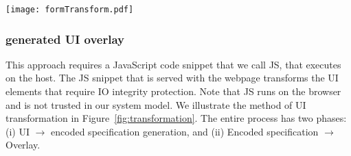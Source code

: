\begin{figure*}[t]
\centering
\texttt{[image: formTransform.pdf]}
\caption{\textbf{Transformation of UI elements: UI $\rightarrow$ encoded specification $\rightarrow$ \device generated UI overlay.} \one The actual webpage and the corresponding \html source shows the UI elements that requires integrity protection. \two These UI elements are transformed into an encoded UI specification (our \name prototype uses QR code that encodes a UI specification, e.g., Specification~\ref{snippet:UISpecification}) by the \name JS. The QR code. \three AThe QR code decoded and overlaid on the HDMI stream by the \device. \four Upon the user's action on the overlaid UI elements, the device signs all the input data. \five The \device sends these signed input data them to the remote server. Note, that the intermediate QR code transformation (\two) is not visible by the user as it is decoded instantaneously by the device.}
\label{fig:transformation}
\end{figure*}


\subsubsection{\bfseries \device generated UI overlay} \label{sec:systemDesign:transformation:overlay}
 
This approach requires a JavaScript code snippet that we call \name JS, that executes on the host. The \name JS snippet that is served with the webpage transforms the UI elements that require IO integrity protection. Note that \name JS runs on the browser and is not trusted in our system model. We illustrate the method of UI transformation in Figure~\ref{fig:transformation}. The entire process has two phases: (i) UI $\rightarrow$ encoded specification generation, and (ii) Encoded specification $\rightarrow$ Overlay.




